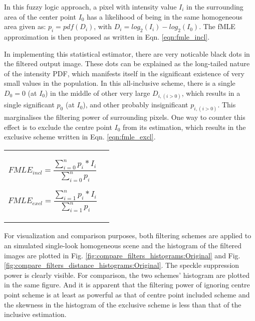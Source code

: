 In this fuzzy logic approach, a pixel with intensity value $I_i$ in the surrounding area of the center point $I_0$ has a likelihood of being in the same homogeneous area given as: 
$p_i = pdf(D_i)$, with $D_i=log_2(I_i) - log_2(I_0)$.
The fMLE approximation is then proposed as written in Eqn. \ref{eqn:fmle_incl}. 

In implementing this statistical estimator, there are very noticable black dots in the filtered output image.
These dots can be explained as the long-tailed nature of the intensity PDF, 
  which manifests itself in the significant existence of very small values in the population.
In this all-inclusive scheme, there is 
	a single $D_0=0$ (at $I_0$) in the middle of other very large $D_{i, (i > 0)}$, which results in
	a single significant $p_0$ (at $I_0$), and other probably insignificant $p_{i, (i>0)}$.
This marginalises the filtering power of surrounding pixels.
One way to counter this effect is to exclude the centre point $I_0$ from its estimation,
  which results in the exclusive scheme written in Eqn. \ref{eqn:fmle_excl}.

\begin{tabular}{c c}
\begin{minipage}[c]{0.45\textwidth}
\begin{equation}
\label{eqn:fmle_incl}
FMLE_{incl}= \frac{\displaystyle{\sum_{i=0}^n{p_i * I_i} } }{\displaystyle{\sum_{i=0}^n{p_i } } }
\end{equation}
\end{minipage}
\begin{minipage}[c]{0.45\textwidth}
\begin{equation}
\label{eqn:fmle_excl}
FMLE_{excl}= \frac{\displaystyle{\sum_{i=1}^n{p_i * I_i} } }{\displaystyle{\sum_{i=1}^n{p_i } } } 
\end{equation}
\end{minipage}
\end{tabular}

For visualization and comparison purposes, both filtering schemes are applied to an simulated single-look homogeneous scene 
and the histogram of the filtered images are plotted in Fig. \ref{fig:compare_filters_histograms:Original} and Fig. \ref{fig:compare_filters_distance_histograms:Original}.
The speckle suppression power is clearly visible.
For comparison, the two schemes’ histogram are plotted in the same figure.
And it is apparent that 
	the filtering power of ignoring centre point scheme is at least as powerful as that of centre point included scheme and
	the skewness in the histogram of the exclusive scheme is less than that of the inclusive estimation.
        

